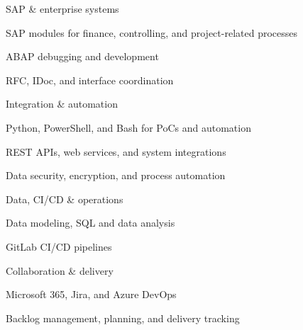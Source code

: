 

\begin{cventries}
  \zcventry
    {SAP \& enterprise systems} %
    {
      \begin{cvitems} %
        \item {SAP modules for finance, controlling, and project-related processes}
        \item {ABAP debugging and development}
        \item {RFC, IDoc, and interface coordination}
      \end{cvitems}
    }

  \zcventry
    {Integration \& automation} %
    {
      \begin{cvitems} %
        \item {Python, PowerShell, and Bash for PoCs and automation}
        \item {REST APIs, web services, and system integrations}
        \item {Data security, encryption, and process automation}
      \end{cvitems}
    }

  \zcventry
    {Data, CI/CD \& operations} %
    {
      \begin{cvitems} %
        \item {Data modeling, SQL and data analysis}
        \item {GitLab CI/CD pipelines}
      \end{cvitems}
    }

  \zcventry
    {Collaboration \& delivery} %
    {
      \begin{cvitems} %
        \item {Microsoft 365, Jira, and Azure DevOps}
        \item {Backlog management, planning, and delivery tracking}
      \end{cvitems}
    }


\end{cventries}

